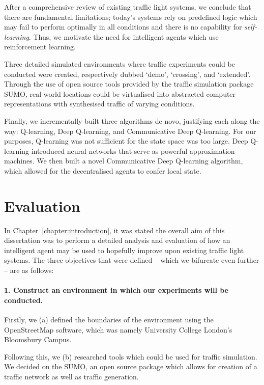 \documentclass[a4paper]{report}
\begin{document}
After a comprehensive review of existing traffic light systems, we conclude that there are fundamental limitations; today's systems rely on predefined logic which may fail to perform optimally in all conditions and there is no capability for \emph{self-learning}. Thus, we motivate the need for intelligent agents which use reinforcement learning.

Three detailed simulated environments where traffic experiments could be conducted were created, respectively dubbed `demo', `crossing', and `extended'. Through the use of open source tools provided by the traffic simulation package SUMO, real world locations could be virtualised into abstracted computer representations with synthesised traffic of varying conditions.

Finally, we incrementally built three algorithms de novo, justifying each along the way: Q-learning, Deep Q-learning, and Communicative Deep Q-learning. For our purposes, Q-learning was not sufficient for the state space was too large. Deep Q-learning introduced neural networks that serve as powerful approximation machines. We then built a novel Communicative Deep Q-learning algorithm, which allowed for the decentralised agents to confer local state.

\section{Evaluation}

In Chapter~\ref{chapter:introduction}, it was stated the overall aim of this dissertation was to perform a detailed analysis and evaluation of how an intelligent agent may be used to hopefully improve upon existing traffic light systems. The three objectives that were defined -- which we bifurcate even further -- are as follows:

\paragraph{1. Construct an environment in which our experiments will be conducted.}

Firstly, we (a) defined the boundaries of the environment using the OpenStreetMap software, which was namely University College London's Bloomsbury Campus.

Following this, we (b) researched tools which could be used for traffic simulation. We decided on the SUMO, an open source package which allows for creation of a traffic network as well as traffic generation.
\end{document}
